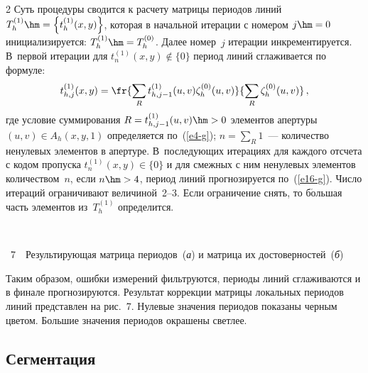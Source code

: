 \begin{multicols}{2}
  Суть процедуры сводится к расчету матрицы периодов линий 
$T_h^{(1)}\hm=\left\{ t_h^{(1)}(x,y)\right\}$, которая в начальной итерации 
с номером $j\hm=0$ инициализируется: $T_h^{(1)}\hm=T_h^{(0)}$. Далее 
номер~$j$ итерации инкрементируется. В~первой итерации для 
$t_n^{(1)}(x,y)\not\in \{0\}$ период линий сглаживается по формуле:
  \begin{equation}
  t_{h,j}^{(1)}(x,y) =\fr{\sum\limits_R t_{h,j-
1}^{(1)}(u,v)\zeta_h^{(0)}(u,v)}{\sum\limits_R \zeta_h^{(0)}(u,v)}\,,
  \label{e16-g}
  \end{equation}
где условие суммирования $R=t_{h,j-1}^{(1)}(u,v)\hm>0$ элементов апертуры 
$(u,v)\in A_h(x,y,1)$ определяется  по~(\ref{e4-g}); $n=\sum\limits_R 1$~--- количество 
ненулевых элементов в апертуре. В~последующих итерациях для каждого 
отсчета с кодом пропуска $t_n^{(1)}(x,y)\in \{0\}$ и для смежных с ним 
ненулевых элементов количеством~$n$, если $n\hm>4$, период линий 
прогнозируется по~(\ref{e16-g}). Число итераций ограничивают 
величиной~2--3. Если ограничение снять, то б$\acute{\mbox{о}}$льшая часть элементов 
из~$T_h^{(1)}$ определится.
\pagebreak

\begin{center} %
\vspace*{1pt}
\mbox{%
 \epsfxsize=79mm
}
\end{center}
\vspace*{3pt}
{{\figurename~7}\ \ \small{Результирующая матрица периодов~(\textit{а}) и матрица их достоверностей~(\textit{б})}}
\vspace*{14pt}

\addtocounter{figure}{1}


  Таким образом, ошибки измерений фильтруются, периоды линий 
сглаживаются и в финале прогнозируются. Результат коррекции матрицы 
локальных периодов линий представлен на рис.~7. Нулевые значения периодов 
показаны черным цветом. Большие значения периодов окрашены светлее.



\subsection{Сегментация} %
  

\end{multicols}
